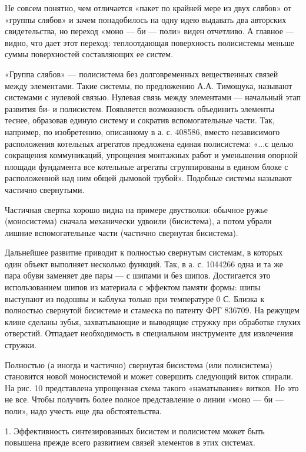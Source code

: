 Не  совсем понятно,  чем отличается  «пакет  по крайней  мере из  двух
слябов» от «группы слябов» и  зачем понадобилось на одну идею выдавать
два  авторских свидетельства,  но переход  «моно  — би  — поли»  виден
отчетливо. А  главное —  видно, что  дает этот  переход: теплоотдающая
поверхность  полисистемы  меньше  суммы поверхностей  составляющих  ее
систем.

«Группа слябов»  — полисистема без долговременных  вещественных связей
между  элементами.  Такие  системы,   по  предложению  А.А.  Тимощука,
называют системами с нулевой связью.  Нулевая связь между элементами —
начальный  этап  развития  би- и  полисистем.  Появляется  возможность
объединить  элементы  теснее,  образовав  единую  систему  и  сократив
вспомогательные  части. Так,  например, по  изобретению, описанному  в
а.  с. 408586,  вместо независимого  расположения котельных  агрегатов
предложена  единая полисистема:  «...с целью  сокращения коммуникаций,
упрощения монтажных работ и  уменьшения опорной площади фундамента все
котельные  агрегаты  сгруппированы  в  едином  блоке  с  расположенной
над  ним общей  дымовой  трубой». Подобные  системы называют  частично
свернутыми.

Частичная свертка  хорошо видна  на примере двустволки:  обычное ружье
(моносистема) сначала механически удвоили  (бисистема), а потом убрали
лишние вспомогательные части (частично свернутая бисистема).

Дальнейшее развитие приводит к полностью свернутым системам, в которых
один объект выполняет  несколько функций. Так, в а. с.  1044266 одна и
та же пара обуви заменяет две пары — с шипами и без шипов. Достигается
это использованием  шипов из материала  с эффектом памяти  формы: шипы
выступают из подошвы  и каблука только при температуре 0  С. Близка к
полностью свернутой  бисистеме и  стамеска по  патенту ФРГ  836709. На
режущем  клине сделаны  зубья, захватывающие  и выводящие  стружку при
обработке  глухих  отверстий.  Отпадает  необходимость  в  специальном
инструменте для извлечения стружки.

Полностью (а иногда и  частично) свернутая бисистема (или полисистема)
становится  новой  моносистемой  и  может  совершить  следующий  виток
спирали. На рис. 10 представлена упрощенная схема такого «наматывания»
витков. Но  это не  все. Чтобы получить  более полное  представление о
линии «моно — би — поли», надо учесть еще два обстоятельства.

1.  Эффективность синтезированных  бисистем  и  полисистем может  быть
повышена прежде всего развитием связей элементов в этих системах.

